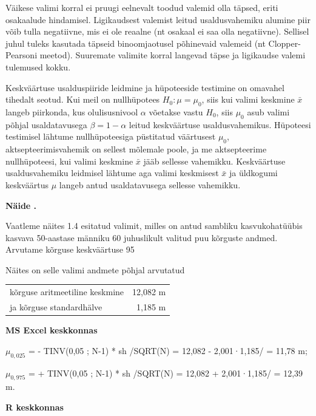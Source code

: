 \documentclass[
]{book}
\newcounter{naidis}[chapter]
\newenvironment{naidis}
{%
\definecolor{shadecolor}{rgb}{200, 200, 0}
\par\parindent 0pt
\begin{framed}
\begin{naitefont}
\refstepcounter{naidis}\textbf{Näide \thenaidis.}
}
{%
\end{naitefont}%
\end{framed}
}%
\theoremstyle{definition}
\theoremstyle{definition}
\theoremstyle{definition}
\theoremstyle{definition}
\theoremstyle{remark}
\begin{document}
Väikese valimi korral ei pruugi eelnevalt toodud valemid olla täpsed, eriti osakaalude hindamisel. Ligikaudsest valemist leitud usaldusvahemiku alumine piir võib tulla negatiivne, mis ei ole reaalne (nt osakaal ei saa olla negatiivne). Sellisel juhul tuleks kasutada täpseid binoomjaotusel põhinevaid valemeid (nt Clopper-Pearsoni meetod). Suuremate valimite korral langevad täpse ja ligikaudse valemi tulemused kokku.

Keskväärtuse usalduspiiride leidmine ja hüpoteeside testimine on omavahel tihedalt seotud. Kui meil on nullhüpotees \(H_0: \mu = \mu_0\), siis kui valimi keskmine \(\bar{x}\) langeb piirkonda, kus olulisusnivool \(\alpha\) võetakse vastu \(H_0\), siis \(\mu_0\) asub valimi põhjal usaldatavusega \(\beta = 1-\alpha\) leitud keskväärtuse usaldusvahemikus. Hüpoteesi testimisel lähtume nullhüpoteesiga püstitatud väärtusest \(\mu_0\), aktsepteerimisvahemik on sellest mõlemale poole, ja me aktsepteerime nullhüpoteesi, kui valimi keskmine \(\bar{x}\) jääb sellesse vahemikku. Keskväärtuse usaldusvahemiku leidmisel lähtume aga valimi keskmisest \(\bar{x}\) ja üldkogumi keskväärtus \(\mu\) langeb antud usaldatavusega sellesse vahemikku.

\begin{naidis}
Vaatleme näites 1.4 esitatud valimit, milles on antud sambliku kasvukohatüübis kasvava 50-aastase männiku 60 juhuslikult valitud puu kõrguste andmed. Arvutame kõrguse keskväärtuse 95%
\end{naidis}

Näites on selle valimi andmete põhjal arvutatud

\begin{tabular}{lr}
kõrguse aritmeetiline keskmine & 12,082 m \\
ja kõrguse standardhälve & 1,185 m \\
\end{tabular}

\textbf{MS Excel keskkonnas }

\(\mu_{0,025}\) = - TINV(0,05 ; N-1) * sh /SQRT(N) = 12,082 - 2,001·1,185/ = 11,78 m;

\(\mu_{0,975}\) = + TINV(0,05 ; N-1) * sh /SQRT(N) = 12,082 + 2,001·1,185/ = 12,39 m.

\textbf{R keskkonnas}
\end{document}
